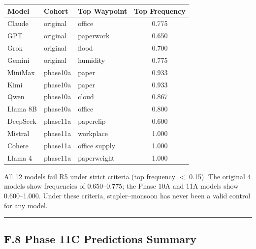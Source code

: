 \begin{longtable}[]{@{}lllc@{}}
\toprule\noalign{}
Model & Cohort & Top Waypoint & Top Frequency \\
\midrule\noalign{}
\endhead
\bottomrule\noalign{}
\endlastfoot
Claude & original & office & 0.775 \\
GPT & original & paperwork & 0.650 \\
Grok & original & flood & 0.700 \\
Gemini & original & humidity & 0.775 \\
MiniMax & phase10a & paper & 0.933 \\
Kimi & phase10a & paper & 0.933 \\
Qwen & phase10a & cloud & 0.867 \\
Llama 8B & phase10a & office & 0.800 \\
DeepSeek & phase11a & paperclip & 0.600 \\
Mistral & phase11a & workplace & 1.000 \\
Cohere & phase11a & office supply & 1.000 \\
Llama 4 & phase11a & paperweight & 1.000 \\
\end{longtable}

All 12 models fail R5 under strict criteria (top frequency \(<\) 0.15). The original 4 models show frequencies of 0.650--0.775; the Phase 10A and 11A models show 0.600--1.000. Under these criteria, stapler--monsoon has never been a valid control for any model.

\begin{center}\rule{0.5\linewidth}{0.5pt}\end{center}

\subsection{F.8 Phase 11C Predictions Summary}\label{f.8-phase-11c-predictions-summary}

